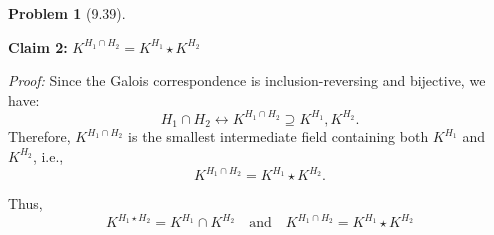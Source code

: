 \documentclass[12pt]{article}
\theoremstyle{definition}
\newtheorem{problem}{Problem}
\begin{document}
\begin{problem}[9.39]
\begin{solution}
        \textbf{Claim 2:} \( K^{H_1 \cap H_2} = K^{H_1} \star K^{H_2} \)
        
        \emph{Proof:} Since the Galois correspondence is inclusion-reversing and bijective, we have:
        \[
        H_1 \cap H_2 \longleftrightarrow K^{H_1 \cap H_2} \supseteq K^{H_1}, K^{H_2}.
        \]
        Therefore, \( K^{H_1 \cap H_2} \) is the smallest intermediate field containing both \( K^{H_1} \) and \( K^{H_2} \), i.e.,
        \[
        K^{H_1 \cap H_2} = K^{H_1} \star K^{H_2}.
        \]
        
        Thus,
        \[
        \boxed{
        K^{H_1 \star H_2} = K^{H_1} \cap K^{H_2} \quad \text{and} \quad K^{H_1 \cap H_2} = K^{H_1} \star K^{H_2}
        }
        \]
        \end{solution}
        
\end{problem}
\end{document}
